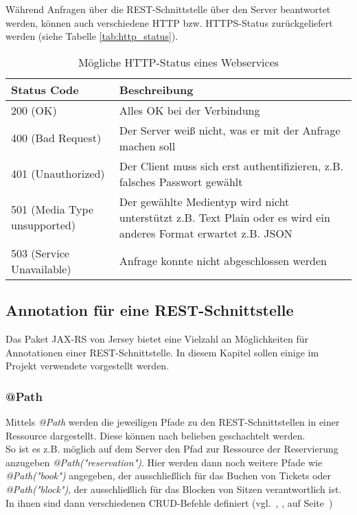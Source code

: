Während Anfragen über die \acs{REST}-Schnittstelle über den Server beantwortet werden, können auch verschiedene \acs{HTTP} bzw. \acs{HTTPS}-Status zurückgeliefert werden (siehe Tabelle \vref{tab:http_status}).

\begin{table}[!hpt]
	\renewcommand{\arraystretch}{1.2}
	\centering
	\begin{tabular}{l|p{8.5cm}}
		Status Code & Beschreibung \\
		\hline
		200 (OK) & Alles OK bei der Verbindung \\
		400 (Bad Request) & Der Server weiß nicht, was er mit der Anfrage machen soll \\
		401 (Unauthorized) & Der Client muss sich erst authentifizieren, z.B. falsches Passwort gewählt \\
		501 (Media Type unsupported) & Der gewählte Medientyp wird nicht unterstützt z.B. Text Plain oder es wird ein anderes Format erwartet z.B. \acs{JSON} \\
		503 (Service Unavailable) & Anfrage konnte nicht abgeschlossen werden
	\end{tabular}
	\caption{Mögliche \acs{HTTP}-Status eines Webservices}
\label{tab:http_status}
\end{table}
\clearpage

\subsection{Annotation für eine \acs{REST}-Schnittstelle}
\label{ssec:annotationen_schnittstelle}
Das Paket JAX-RS von Jersey bietet eine Vielzahl an Möglichkeiten für Annotationen einer \acs{REST}-Schnittstelle. In diesem Kapitel sollen einige im Projekt verwendete vorgestellt werden.

\subsubsection*{@Path}
Mittels \textit{@Path} werden die jeweiligen Pfade zu den \acs{REST}-Schnittstellen in einer Ressource dargestellt. Diese können nach belieben geschachtelt werden. \\
So ist es z.B. möglich auf dem Server den Pfad zur Ressource der Reservierung anzugeben \textit{@Path("reservation")}. 
Hier werden dann noch weitere Pfade wie \textit{@Path("book")} angegeben, der ausschließlich für das Buchen von Tickets oder \textit{@Path("block")}, der ausschließlich für das Blocken von Sitzen verantwortlich ist. In ihnen sind dann verschiedenen \acs{CRUD}-Befehle definiert (vgl.~, ,  auf Seite~\pageref{sss:delete}) 

